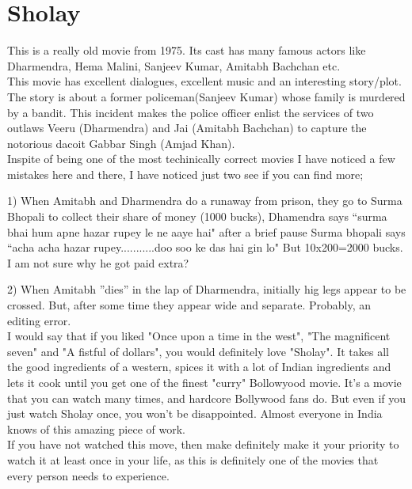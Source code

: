 \documentclass{article}
\author{Varun Khare, GSSS Rao}
\date{March 2017 }
\begin{document}
\maketitle
\section{Sholay}
This is a really old movie from 1975. Its cast has many famous actors like Dharmendra, Hema Malini, Sanjeev Kumar, Amitabh Bachchan etc.
\\
This movie has excellent dialogues, excellent music and an interesting story/plot. The story is about a former policeman(Sanjeev Kumar) whose family is murdered by a bandit. This incident makes the police officer enlist the services of two outlaws Veeru (Dharmendra) and Jai (Amitabh Bachchan) to capture the notorious dacoit Gabbar Singh (Amjad Khan).
\\
Inspite of being one of the most techinically correct movies I have noticed a few mistakes here and there, I have noticed just two see if you can find more;

1) When Amitabh and Dharmendra do a runaway from prison, they go to Surma Bhopali to collect their share of money (1000 bucks), Dhamendra says ``surma bhai hum apne hazar rupey le ne aaye hai" after a brief pause Surma bhopali says ``acha acha hazar rupey...........doo soo ke das hai gin lo" But 10x200=2000 bucks. I am not sure why he got paid extra?

2) When Amitabh ''dies'' in the lap of Dharmendra, initially hig legs appear to be crossed. But, after some time they appear wide and separate. Probably, an editing error.
\\
I would say that if you liked "Once upon a time in the west", "The magnificent seven" and "A fistful of dollars", you would definitely love "Sholay". It takes all the good ingredients of a western, spices it with a lot of Indian ingredients and lets it cook until you get one of the finest "curry" Bollowyood movie. 
It's a movie that you can watch many times, and hardcore Bollywood fans do. But even if you just watch Sholay once, you won't be disappointed. Almost everyone in India knows of this amazing piece of work. 
\\
If you have not watched this move, then make definitely make it your priority to watch it at least once in your life, as this is definitely one of the movies that every person needs to experience.
\end{document}
